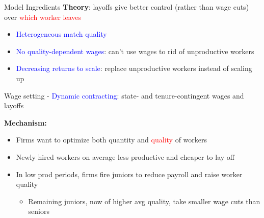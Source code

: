 \documentclass[9pt,aspectratio=169]{beamer} %
\begin{document}
\begin{frame}{Model Ingredients} %
\textbf{Theory}: layoffs give better control (rather than wage cuts)  over \textcolor{red}{which worker leaves}
\begin{itemize}
    \item \textcolor{blue}{Heterogeneous match quality}
\vspace{5pt}    
    \item \textcolor{blue}{No quality-dependent wages}: can't use wages to rid of unproductive workers
\vspace{5pt}
    \item \textcolor{blue}{Decreasing returns to scale}: replace unproductive workers instead of scaling up
\end{itemize}
\vspace{5pt}
Wage setting - \textcolor{blue}{Dynamic contracting}: state- and tenure-contingent wages and layoffs

\vspace{15pt}
    \textbf{Mechanism:}
\begin{itemize}
    \item Firms want to optimize both quantity and \textcolor{red}{quality} of workers
    \item Newly hired workers on average less productive and cheaper to lay off
    \item In low prod periods, firms fire juniors to reduce payroll and raise worker quality
        \begin{itemize}
            \item Remaining juniors, now of higher avg quality, take smaller wage cuts than seniors
        \end{itemize}
\end{itemize}
\end{frame}
\end{document}
